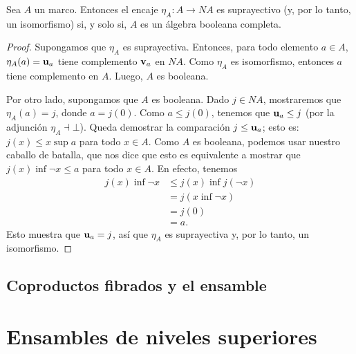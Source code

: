 \begin{theorem}
  \label{thm:ensamble-booleanidad}
  Sea $A$ un marco.
  Entonces el encaje $\eta_A:A\to NA$ es suprayectivo (y, por lo
  tanto, un isomorfismo) si, y solo
  si, $A$ es un álgebra booleana completa.
\end{theorem}
\begin{proof}
    Supongamos que $\eta_A$ es suprayectiva.
    Entonces, para todo elemento $a\in A$,
    $\eta_A(a)=\mathbf u_{a}$ tiene complemento $\mathbf v_{a}$ en $NA$.
    Como $\eta_A$ es isomorfismo, entonces
    $a$ tiene complemento en $A$.
    Luego, $A$ es booleana.
    
    Por otro lado, supongamos que $A$ es booleana.
    Dado $j\in NA$, mostraremos que $\eta_A(a)=j$,
    donde $a=j(0)$.
    Como $a\leq j(0)$, tenemos que $\mathbf u_{a}\leq j$
    (por la adjunción $\eta_A\dashv\bot$).
    Queda demostrar la comparación $j\leq\mathbf u_{a}$;
    esto es: $j(x)\leq x\sup a$ para todo $x\in A$.
    Como $A$ es booleana, podemos usar nuestro
    caballo de batalla, que nos dice que esto es equivalente
    a mostrar que $j(x)\inf\neg x\leq a$ para todo $x\in A$.
    En efecto, tenemos
    \begin{align*}
        j(x)\inf\neg x
        &\leq j(x)\inf j(\neg x) \\
        &= j(x\inf\neg x) \\
        &= j(0) \\
        &= a.
    \end{align*}
    Esto muestra que $\mathbf u_{a}=j$,
    así que $\eta_A$ es suprayectiva y,
    por lo tanto, un isomorfismo.
\end{proof}
\subsection{ Coproductos fibrados y el ensamble}\label{pushots}

\section{Ensambles de niveles superiores}\label{Nalpha}

